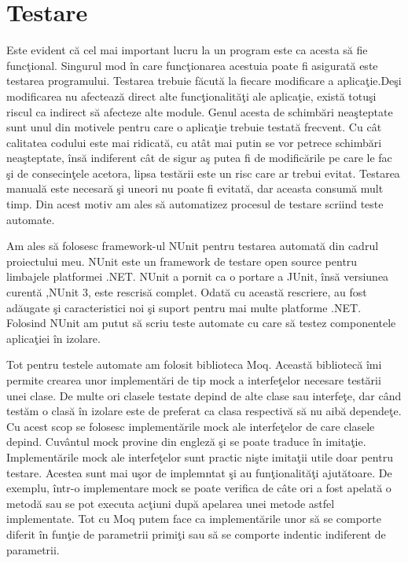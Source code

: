 \documentclass[a4paper,12pt]{report}
\begin{document}
\section{Testare}

Este evident c\u a cel mai important lucru la un program este ca acesta s\u a fie func\c tional.
Singurul mod \^in care func\c tionarea acestuia poate fi asigurat\u a este testarea programului.
Testarea trebuie f\u acut\u a la fiecare modificare a aplica\c tie.De\c si modificarea nu afecteaz\u a
direct alte func\c tionalit\u a\c ti ale aplica\c tie, exist\u a totu\c si riscul ca indirect s\u a afecteze
alte module. Genul acesta de schimb\u ari nea\c steptate sunt unul din motivele pentru care o aplica\c tie
trebuie testat\u a frecvent. Cu c\^at calitatea codului este mai ridicat\u a, cu at\^at mai putin se vor 
petrece schimb\u ari nea\c steptate, \^ins\u a indiferent c\^at de sigur a\c s putea fi de modific\u arile 
pe care le fac \c si de consecin\c tele acetora, lipsa test\u arii este un risc care ar trebui evitat.
Testarea manual\u a este necesar\u a \c si uneori nu poate fi evitat\u a, dar aceasta consum\u a mult timp.
Din acest motiv am ales s\u a automatizez procesul de testare scriind teste automate.

Am ales s\u a folosesc framework-ul NUnit pentru testarea automat\u a din cadrul proiectului meu.
NUnit este un framework de testare open source pentru limbajele platformei .NET. NUnit a pornit ca 
o portare a JUnit, \^ins\u a versiunea curent\u a ,NUnit 3, este rescris\u a complet. Odat\u a cu 
aceast\u a rescriere, au fost ad\u augate \c si caracteristici noi \c si suport pentru mai multe platforme .NET.
Folosind NUnit am putut s\u a scriu teste automate cu care s\u a testez componentele aplica\c tiei \^in izolare.

Tot pentru testele automate am folosit biblioteca Moq. Aceast\u a bibliotec\u a \^imi permite crearea unor implement\u ari
de tip mock a interfe\c telor necesare test\u arii unei clase. De multe ori clasele testate depind de alte clase sau 
interfe\c te, dar c\^and test\u am o clas\u a \^in izolare este de preferat ca clasa respectiv\u a s\u a nu aib\u a depende\c te.
Cu acest scop se folosesc implement\u arile mock ale interfe\c telor de care clasele depind. Cuv\^antul mock provine din
englez\u a \c si se poate traduce \^in imita\c tie. Implement\u arile mock ale interfe\c telor sunt practic ni\c ste imita\c tii 
utile doar pentru testare. Acestea sunt mai u\c sor de implemntat \c si au fun\c tionalit\u a\c ti ajut\u atoare.
De exemplu, \^intr-o implementare mock se poate verifica de c\^ate ori a fost apelat\u a o metod\u a sau se pot executa 
ac\c tiuni dup\u a apelarea unei metode astfel implementate. Tot cu Moq putem face ca implement\u arile unor s\u a se comporte diferit 
\^in fun\c tie de parametrii primi\c ti sau s\u a se comporte indentic indiferent de parametrii.
\end{document}
